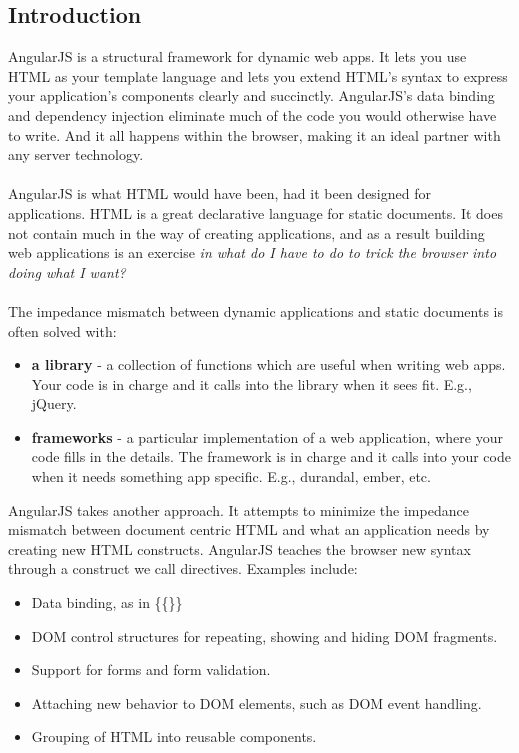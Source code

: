 \documentclass[12pt]{article}
\begin{document}
	\subsection{Introduction}
	AngularJS is a structural framework for dynamic web apps. It lets you use HTML as your template language and lets you extend HTML's syntax to express your application's components clearly and succinctly. AngularJS's data binding and dependency injection eliminate much of the code you would otherwise have to write.  And it all happens within the browser, making it an ideal partner with any server technology.
	\\
	\\
	AngularJS is what HTML would have been, had it been designed for applications. HTML is a great declarative language for static documents. It does not contain much in the way of creating applications, and as a result building web applications is an exercise \textit{in what do I have to do to trick the browser into doing what I want?}
	\\
	\\
	The impedance mismatch between dynamic applications and static documents is often solved with:
	\begin{itemize}
		
		\item \textbf{a library} - a collection of functions which are useful when writing web apps. Your code is in charge and it calls into the library when it sees fit. E.g., \colorbox{mygray}{jQuery}.
		\item \textbf{frameworks} - a particular implementation of a web application, where your code fills in the details. The framework is in charge and it calls into your code when it needs something app specific. E.g., \colorbox{mygray}{durandal}, \colorbox{mygray}{ember}, etc.
	\end{itemize}
	AngularJS takes another approach. It attempts to minimize the impedance mismatch between document centric HTML and what an application needs by creating new HTML constructs. AngularJS teaches the browser new syntax through a construct we call directives. Examples include:
	\begin{itemize}
		\item Data binding, as in \colorbox{mygray}{\{\{\}\}}
		\item DOM control structures for repeating, showing and hiding DOM fragments.
		\item Support for forms and form validation.
		\item Attaching new behavior to DOM elements, such as DOM event handling.
		\item Grouping of HTML into reusable components.
		
	\end{itemize}	
	
\end{document}
